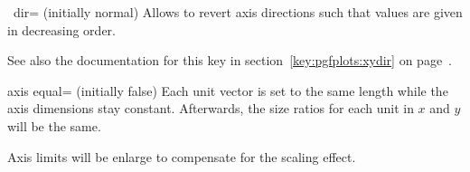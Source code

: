 \begin{pgfplotsxykey}{\x\ dir= (initially normal)}
	Allows to revert axis directions such that values are given in decreasing order.

	See also the documentation for this key in section~\ref{key:pgfplots:xydir} on page~\pageref{key:pgfplots:xydir}.
\end{pgfplotsxykey}

\begin{pgfplotskey}{axis equal= (initially false)}
	Each unit vector is set to the same length while the axis dimensions stay constant. Afterwards, the size ratios for each unit in $x$ and $y$ will be the same.
	
	Axis limits will be enlarge to compensate for the scaling effect.
\begin{codeexample}[]
\hspace{1cm}
\end{codeexample}
	
\begin{codeexample}[]
\hspace{1cm}
\end{codeexample}
\end{pgfplotskey}

